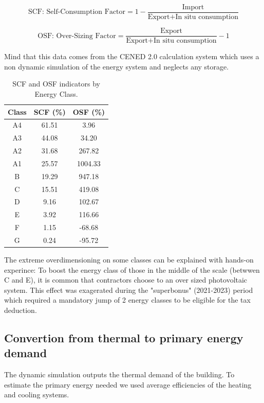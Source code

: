 \begin{equation}
    \text{SCF: Self-Consumption Factor} = 1 - \frac{\text{Import}}{\text{Export} + \text{In situ consumption}}
\end{equation}

\begin{equation}
    \text{OSF: Over-Sizing Factor} = \frac{\text{Export}}{\text{Export} + \text{In situ consumption}} - 1
\end{equation}

Mind that this data comes from the CENED 2.0 calculation system which uses a non dynamic simulation of the energy system and neglects
any storage.

\begin{table}[H]
    \centering
    \begin{tabular}{|c|c|c|}
        \hline
        \textbf{Class} & \textbf{SCF (\%)} & \textbf{OSF (\%)} \\
        \hline
        A4 & 61.51 & 3.96 \\
        A3 & 44.08 & 34.20 \\
        A2 & 31.68 & 267.82 \\
        A1 & 25.57 & 1004.33 \\
        B  & 19.29 & 947.18 \\
        C  & 15.51 & 419.08 \\
        D  & 9.16  & 102.67 \\
        E  & 3.92  & 116.66 \\
        F  & 1.15  & -68.68 \\
        G  & 0.24  & -95.72 \\
        \hline
    \end{tabular}
    \caption{SCF and OSF indicators by Energy Class.}
    \label{tab:pv_scf_osf}
\end{table}

The extreme overdimensioning on some classes can be explained with hands-on experince:
To boost the energy class of those in the middle of the scale (betwwen C and E),
it is common that contractors choose to an over sized photovoltaic system.
This effect was exagerated during the "superbonus" (2021-2023) period which required a mandatory jump of 2 energy classes to be eligible for the tax deduction.


\subsection{Convertion from thermal to primary energy demand}
The dynamic simulation outputs the thermal demand of the building. 
To estimate the primary energy needed we used average efficiencies of the heating and cooling systems.

